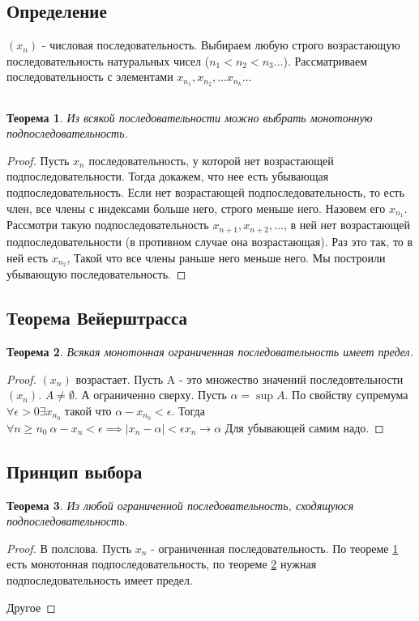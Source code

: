 \documentclass[a4paper]{scrartcl}
\newtheorem{theorem}{Теорема}
\begin{document}
\subsection{Определение}
$(x_n)$ - числовая последовательность. Выбираем любую строго возрастающую последовательность натуральных чисел ($n_1 < n_2  < n_3 \dots $). Рассматриваем последовательность с элементами $x_{n_1}, x_{n_2}, \dots x_{n_{k}} \dots$
\subsection{}
\begin{theorem} \label{1}
	Из всякой последовательности можно выбрать монотонную подпоследовательность.
\end{theorem}
\begin{proof}

	Пусть $x_n$ последовательность, у которой нет возрастающей подпоследовательности. Тогда
	докажем, что нее есть убывающая подпоследовательность. Если нет возрастающей подпоследовательность, то
	есть член, все члены с индексами больше него, строго меньше него. Назовем его $x_{n_1}$.
	Рассмотри такую подпоследовательность $x_{n +1} , x_{n + 2},\dots$, в ней нет возрастающей подпоследовательности (в противном случае она возрастающая). Раз это так, то в ней есть  $x_{n_2}$, Такой что все члены раньше него меньше него. Мы построили убывающую последовательность.
\end{proof}
\subsection{Теорема Вейерштрасса}
\begin{theorem} \label{weir}
	Всякая монотонная ограниченная последовательность имеет предел.
\end{theorem}
\begin{proof}
	$(x_n)$ возрастает. Пусть A - это множество значений последовтельности  $(x_n)$. $A \neq \emptyset$.
	А ограниченно сверху. Пусть $\alpha = \sup{A}$. По свойству супремума  $\forall \epsilon > 0 \exists x_{n_0}$ такой что $\alpha - x_{n_0} < \epsilon$. Тогда  $\forall  n\ge n_0 ~ \alpha -x_{n} < \epsilon \implies \mid x_n -\alpha \mid < \epsilon x_n \to \alpha$
	Для убывающей самим надо.
\end{proof}
\subsection{Принцип выбора}
\begin{theorem}
	Из любой ограниченной последовательность, сходящуюся подпоследовательность.
\end{theorem}
\begin{proof}
	В полслова. Пусть $x_n$ - ограниченная последовательность. По теореме \ref{1} есть монотонная подпоследовательность, по теореме \ref{weir} нужная подпоследовательность имеет предел.

	Другое
\end{proof}
\end{document}
